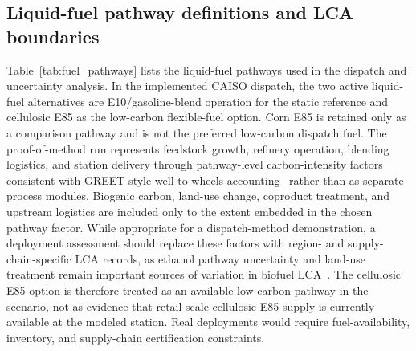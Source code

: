 \documentclass[cleantechnol,article,submit,pdftex,moreauthors]{Definitions/mdpi}
\begin{document}
\subsection{Liquid-fuel pathway definitions and LCA boundaries}
\label{subsec:fuel_pathways}

Table~\ref{tab:fuel_pathways} lists the liquid-fuel pathways used in the dispatch and uncertainty analysis. In the implemented CAISO dispatch, the two active liquid-fuel alternatives are E10/gasoline-blend operation for the static reference and cellulosic E85 as the low-carbon flexible-fuel option. Corn E85 is retained only as a comparison pathway and is not the preferred low-carbon dispatch fuel. The proof-of-method run represents feedstock growth, refinery operation, blending logistics, and station delivery through pathway-level carbon-intensity factors consistent with GREET-style well-to-wheels accounting~\cite{Argonne2023,Elgowainy2018} rather than as separate process modules. Biogenic carbon, land-use change, coproduct treatment, and upstream logistics are included only to the extent embedded in the chosen pathway factor. While appropriate for a dispatch-method demonstration, a deployment assessment should replace these factors with region- and supply-chain-specific LCA records, as ethanol pathway uncertainty and land-use treatment remain important sources of variation in biofuel LCA~\cite{Liska2009}. The cellulosic E85 option is therefore treated as an available low-carbon pathway in the scenario, not as evidence that retail-scale cellulosic E85 supply is currently available at the modeled station. Real deployments would require fuel-availability, inventory, and supply-chain certification constraints.
\end{document}

